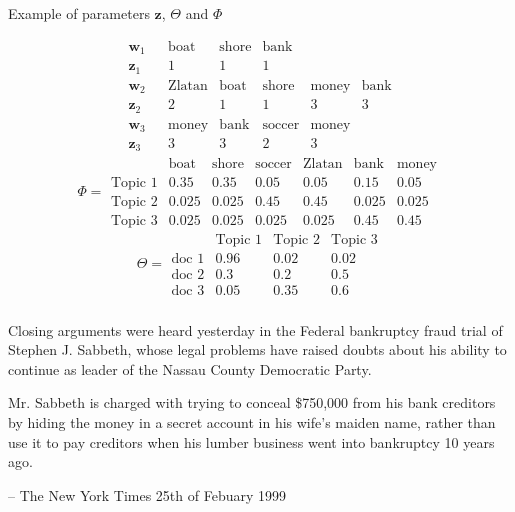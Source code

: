 \documentclass[10pt]{beamer}
\begin{document}
\begin{frame}{Example of parameters  $\mathbf{z}$, $\Theta$ and $\Phi$}

\[
\begin{array}{ccccccc}
\mathbf{w}_{1} &  & \mbox{boat} & \mbox{shore} & \mbox{bank}\\
\mathbf{z}_{1} &  & 1 & 1 & 1\\
\mathbf{w}_{2} &  & \mbox{Zlatan} & \mbox{boat} & \mbox{shore} & \mbox{money} & \mbox{bank}\\
\mathbf{z}_{2} &  & 2 & 1 & 1 & 3 & 3\\
\mathbf{w}_{3} &  & \mbox{money} & \mbox{bank} & \mbox{soccer} & \mbox{money}\\
\mathbf{z}_{3} &  & 3 & 3 & 2 & 3
\end{array}
\]
\pause
\[
\Phi=\begin{array}{ccccccc}
 & \mbox{boat} & \mbox{shore} & \mbox{soccer} & \mbox{Zlatan} & \mbox{bank} & \mbox{money}\\
\text{Topic 1} & 0.35 & 0.35 & 0.05 & 0.05 & 0.15 & 0.05\\
\text{Topic 2} & 0.025 & 0.025 & 0.45 & 0.45 & 0.025 & 0.025\\
\text{Topic 3} & 0.025 & 0.025 & 0.025 & 0.025 & 0.45 & 0.45
\end{array}
\]
\pause
\[
\Theta=\begin{array}{cccc}
 & \text{Topic 1} & \text{Topic 2} & \text{Topic 3}\\
\text{doc 1} & 0.96 & 0.02 & 0.02\\
\text{doc 2} & 0.3 & 0.2 & 0.5\\
\text{doc 3} & 0.05 & 0.35 & 0.6
\end{array}
\]


\end{frame}






\begin{frame}
\frametitle{}

\begin{displayquote}
Closing arguments were heard yesterday in the Federal bankruptcy fraud trial of Stephen J. Sabbeth, whose legal problems have raised doubts about his ability to continue as leader of the Nassau County Democratic Party.

\medskip

Mr. Sabbeth is charged with trying to conceal \$750,000 from his bank creditors by hiding the money in a secret account in his wife's maiden name, rather than use it to pay creditors when his lumber business went into bankruptcy 10 years ago.

\end{displayquote}

\hspace{10mm} -- The New York Times 25th of Febuary 1999

\end{frame}
\end{document}
